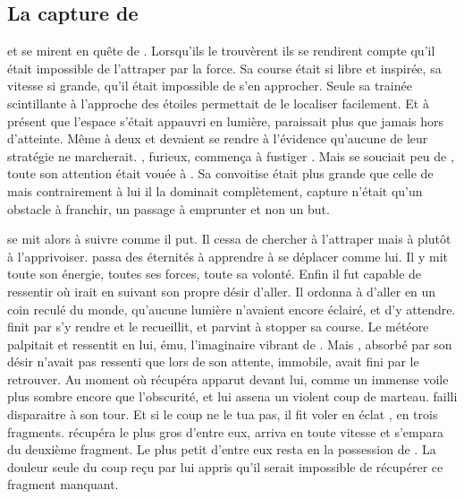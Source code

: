 



   

\subsection{La capture de \Drisst}

\Ogo et \Shuru se mirent en quête de \Drisst. Lorsqu'ils le trouvèrent ils se rendirent compte qu'il était impossible de l'attraper par la force. Sa course était si libre et inspirée, sa vitesse si grande, qu'il était impossible de s'en approcher. Seule sa trainée scintillante à l'approche des étoiles permettait de le localiser facilement. Et à présent que l'espace s'était appauvri en lumière, \Drisst paraissait plus que jamais hors d'atteinte. Même à deux \Ogo et \Shuru devaient se rendre à l'évidence qu'aucune de leur stratégie ne marcherait. \Shuru, furieux, commença à fustiger \Ogo. Mais \Ogo se souciait peu de \Shuru, toute son attention était vouée à \Drisst. Sa convoitise était plus grande que celle de \Shuru mais contrairement à lui il la dominait complètement, capture \Drisst n'était qu'un obstacle à franchir, un passage à emprunter et non un but.

\Ogo se mit alors à suivre \Drisst comme il put. Il cessa de chercher à l'attraper mais à plutôt à l'apprivoiser. \Ogo passa des éternités à apprendre à se déplacer comme lui. Il y mit toute son énergie, toutes ses forces, toute sa volonté. Enfin il fut capable de ressentir où \Drisst irait en suivant son propre désir d'aller. Il ordonna à \Shuru d'aller en un coin reculé du monde, qu'aucune lumière n'avaient encore éclairé, et d'y attendre. \Drisst finit par s'y rendre et \Shuru le recueillit, et parvint à stopper sa course. Le météore palpitait et \Shuru ressentit en lui, ému, l'imaginaire vibrant de \Mey. Mais \Shuru, absorbé par son désir n'avait pas ressenti que lors de son attente, immobile, \Carac avait fini par le retrouver. Au moment où \Shuru récupéra \Drisst \Carac apparut devant lui, comme un immense voile plus sombre encore que l'obscurité, et lui assena un violent coup de marteau. \Shuru failli disparaitre à son tour. Et si le coup ne le tua pas, il fit voler en éclat \Drisst, en trois fragments. \Carac récupéra le plus gros d'entre eux, \Ogo arriva en toute vitesse et s'empara du deuxième fragment. Le plus petit d'entre eux resta en la possession de \Shuru. La douleur seule du coup reçu par \Carac lui appris qu'il serait impossible de récupérer ce fragment manquant.

